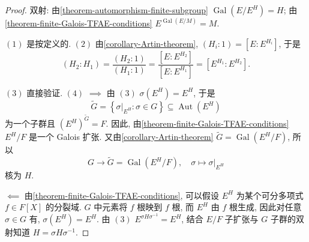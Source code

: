 \begin{proof}
  双射:
  由\cref{theorem-automorphism-finite-subgroup} \( \operatorname{Gal}(E/E^H) = H
  \);
  由\cref{theorem-finite-Galois-TFAE-conditions} \( E^{\operatorname{Gal}(E/M)}
  = M \).

  \( (1) \) 是按定义的.
  \( (2) \)
  由\cref{corollary-Artin-theorem}, \( (H_i:1) = [E:E^{H_i}] \), 于是
  \[
    (H_2:H_1) = \frac{(H_2:1)}{(H_1:1)} = \frac{[E:E^{H_2}]}{[E:E^{H_1}]} =
    [E^{H_1}:E^{H_2}].
  \]

  \( (3) \) 直接验证.
  \( (4) \)
  \( \implies \) 由 \( (3) \) \( \sigma(E^H) = E^H \), 于是
  \[
    \widetilde{G} = \left\lbrace \left.\sigma\right\vert_{E^H}: \sigma \in G
      \right\rbrace \subseteq \operatorname{Aut}(E^H)
  \]
  为一个子群且 \( (E^{H})^{\widetilde{G}} = F \).
  因此, 由\cref{theorem-finite-Galois-TFAE-conditions} \( E^H/F \) 是一个 Galois
  扩张.
  又由\cref{corollary-Artin-theorem} \( \widetilde{G} = \operatorname{Gal}(E^H /
  F) \), 所以
  \[
    G \to \widetilde{G} = \operatorname{Gal}(E^H/F),\quad \sigma \mapsto
    \left. \sigma \right\vert_{E^H}
  \]
  核为 \( H \).

  \( \impliedby \) 由\cref{theorem-finite-Galois-TFAE-conditions}, 可以假设 \(
  E^H \) 为某个可分多项式 \( f \in F[X] \) 的分裂域.
  \( G \) 中元素将 \( f \) 根映到 \( f \) 根, 而 \( E^H \) 由 \( f \) 根生成,
  因此对任意 \( \sigma \in G \) 有, \( \sigma(E^H) = E^H \).
  由 \( (3) \) \( E^{\sigma H \sigma^{-1}} = E^{H} \), 结合 \( E/F \) 子扩张与
  \( G \) 子群的双射知道 \( H = \sigma H \sigma^{-1} \).
\end{proof}

